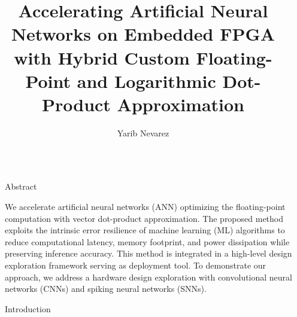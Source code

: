 \documentclass[final]{beamer}
\title{Accelerating Artificial Neural Networks on Embedded FPGA with Hybrid Custom Floating-Point and Logarithmic Dot-Product Approximation} %
\author{Yarib Nevarez} %
\institute{Universit\"at Bremen, \href{mailto:nevarez@item.uni-bremen.de}{nevarez@item.uni-bremen.de}} %
\newlength{\sepwid}
\newlength{\onecolwid}
\begin{document}

\setlength{\belowcaptionskip}{2ex} %
\setlength\belowdisplayshortskip{2ex} %

\begin{frame}[t] %

\begin{columns}[t] %

\begin{column}{\sepwid}\end{column} %

\begin{column}{\onecolwid} %


\begin{alertblock}{Abstract}

We accelerate artificial neural networks (ANN) optimizing the floating-point computation with vector dot-product approximation. The proposed method exploits the intrinsic error resilience of machine learning (ML) algorithms to reduce computational latency, memory footprint, and power dissipation while preserving inference accuracy. This method is integrated in a high-level design exploration framework serving as deployment tool. To demonstrate our approach, we address a hardware design exploration with convolutional neural networks (CNNs) and spiking neural networks (SNNs).
\end{alertblock}


\begin{block}{Introduction}


\end{block}
\end{column}
\end{columns}
\end{frame}
\end{document}
